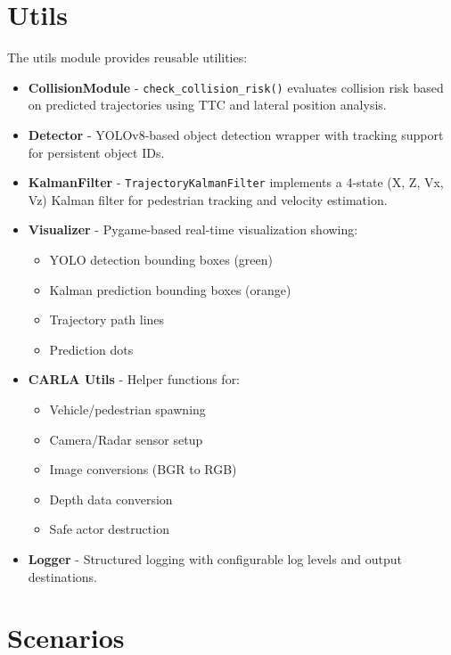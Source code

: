 \section{Utils}

The utils module provides reusable utilities:

\begin{itemize}
    \item \textbf{CollisionModule} - \texttt{check\_collision\_risk()} evaluates collision risk based on predicted trajectories using TTC and lateral position analysis.

    \item \textbf{Detector} - YOLOv8-based object detection wrapper with tracking support for persistent object IDs.

    \item \textbf{KalmanFilter} - \texttt{TrajectoryKalmanFilter} implements a 4-state (X, Z, Vx, Vz) Kalman filter for pedestrian tracking and velocity estimation.

    \item \textbf{Visualizer} - Pygame-based real-time visualization showing:
    \begin{itemize}
        \item YOLO detection bounding boxes (green)
        \item Kalman prediction bounding boxes (orange)
        \item Trajectory path lines
        \item Prediction dots
    \end{itemize}

    \item \textbf{CARLA Utils} - Helper functions for:
    \begin{itemize}
        \item Vehicle/pedestrian spawning
        \item Camera/Radar sensor setup
        \item Image conversions (BGR to RGB)
        \item Depth data conversion
        \item Safe actor destruction
    \end{itemize}

    \item \textbf{Logger} - Structured logging with configurable log levels and output destinations.
\end{itemize}

\section{Scenarios}


